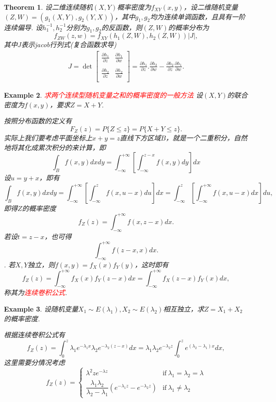\documentclass{article}
\newtheorem{theorem}{Theorem}[section]
\newtheorem{example}[theorem]{Example}
\newcommand{\redt}[1]{\textcolor{red}{#1}}
\begin{document}
\begin{theorem}
\rm 设二维连续随机$(X,Y)$概率密度为$f_{XY}(x,y)$，设二维随机变量$(Z,W) = (g_1(X,Y),g_2(Y,X))$，其中$g_1,g_2$均为连续单调函数，且具有一阶连续偏导. 设$h_1^{-1},h_2^{-1}$分别为$g_1,g_2$的反函数，则$(Z,W)$的概率分布为
$$
f_{ZW}(z,w) = f_{XY}(h_1(Z,W),h_2(Z,W))|J|,
$$
其中$J$表示jacob行列式(复合函数求导)
\begin{align}
  \nonumber J=   \det  \begin{bmatrix}
                        \frac{\partial h_1}{\partial z} & \frac{\partial h_1}{\partial w}  \\
                         &  \\
                        \frac{\partial h_2}{\partial z}  & \frac{\partial h_2}{\partial w}  \\
                      \end{bmatrix}
                      =\frac{\partial h_1}{\partial z}.\frac{\partial h_2}{\partial w}-\frac{\partial h_2}{\partial z}\frac{\partial h_1}{\partial w}.
\end{align}
\end{theorem}

\begin{example}
\rm \redt{求两个连续型随机变量之和的概率密度的一般方法} 设$(X,Y)$的联合密度为$f(x,y)$，要求$Z=X+Y$.

按照分布函数的定义有
$$
F_Z(z)=P\{Z \leq z\} = P\{X+Y \leq z\}.
$$
实际上我们要考虑平面坐标上$x+y=z$直线下方区域$B$，就是一个二重积分，自然地将其化成累次积分的来计算，即
$$
\int_{B} f(x,y)dxdy = \int_{-\infty}^{+\infty}\left[ \int_{-\infty}^{z-x} f(x,y)dy \right] dx
$$
设$u = y+x$，即有
$$
\int_{B} f(x,y)dxdy = \int_{-\infty}^{+\infty}\left[ \int_{-\infty}^{z} f(x,u-x)du \right] dx = \int_{-\infty}^{z} \left[ \int_{-\infty}^{+\infty} f(x,u-x)dx \right] du, 
$$
即得$Z$的概率密度
$$
f_Z(z) = \int_{-\infty}^{+\infty} f(x,z-x)dx.
$$
若设$t=z-x$，也可得
$$
\int_{-\infty}^{+\infty} f(z-x,x)dx.
$$.
若$X,Y$独立，则$f(x,y)=f_X(x)f_Y(y)$，这时即有
$$
f_Z(z) = \int_{-\infty}^{+\infty} f_X(x)f_Y(z-x)dx = \int_{-\infty}^{+\infty} f_X(z-x)f_Y(x)dx,
$$
称其为\redt{连续卷积公式}. 
\end{example}

\begin{example}
\rm 设随机变量$X_1 \sim E(\lambda_1),X_2 \sim E(\lambda_2)$相互独立，求$Z = X_1 + X_2$的概率密度. 

根据连续卷积公式有
$$
f_Z(z) = \int_0^{z} \lambda_1 e^{-\lambda_1x}\lambda_2 e^{-\lambda_2(z-x)}dx = \lambda_1\lambda_2 e^{-\lambda_2z} \int_0^{z} e^{(\lambda_2 - \lambda_1)x}dx,   
$$
这里需要分情况考虑
$$
f_Z(z) = \left \{ \begin{array}{ll}
\lambda^2 ze^{-\lambda z} & \text{if}~\lambda_1 = \lambda_2 = \lambda \\
\dfrac {\lambda _{1}\lambda _{2}}{\lambda _{2}-\lambda _{1}}\left(e^{-\lambda _{1}z}-e^{-\lambda _{2}z}\right) & \text{if}~\lambda_1 \neq \lambda_2
\end{array} \right.
$$
\end{example}
\end{document}
